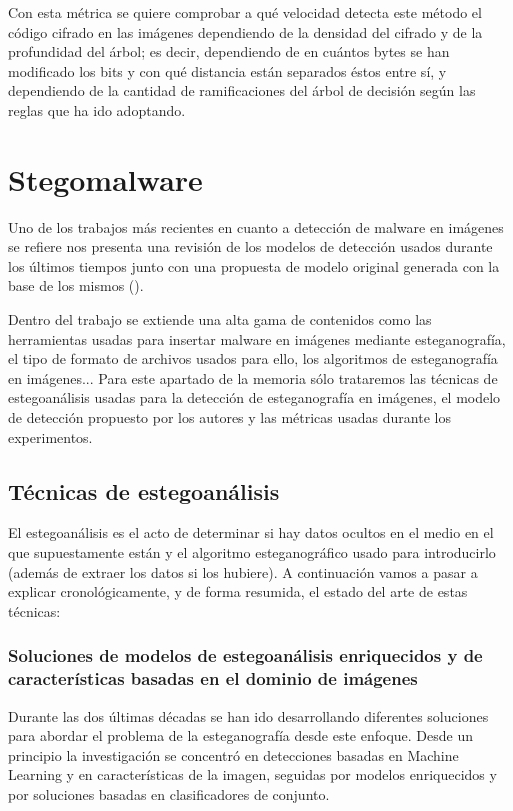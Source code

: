 Con esta métrica se quiere comprobar a qué velocidad detecta este método el código cifrado en las imágenes dependiendo de la densidad del cifrado y de la profundidad del árbol; es decir, dependiendo de en cuántos bytes se han modificado los bits y con qué distancia están separados éstos entre sí, y dependiendo de la cantidad de ramificaciones del árbol de decisión según las reglas que ha ido adoptando.

\section{Stegomalware}

Uno de los trabajos más recientes en cuanto a detección de malware en imágenes se refiere nos presenta una revisión de los modelos de detección usados durante los últimos tiempos junto con una propuesta de modelo original generada con la base de los mismos (\cite{stegomalware}). %

Dentro del trabajo se extiende una alta gama de contenidos como las herramientas usadas para insertar malware en imágenes mediante esteganografía, el tipo de formato de archivos usados para ello, los algoritmos de esteganografía en imágenes... Para este apartado de la memoria sólo trataremos las técnicas de estegoanálisis usadas para la detección de esteganografía en imágenes, el modelo de detección propuesto por los autores y las métricas usadas durante los experimentos.

\subsection{Técnicas de estegoanálisis}

El estegoanálisis es el acto de determinar si hay datos ocultos en el medio en el que supuestamente están y el algoritmo esteganográfico usado para introducirlo (además de extraer los datos si los hubiere). A continuación vamos a pasar a explicar cronológicamente, y de forma resumida, el estado del arte de estas técnicas:

\subsubsection{Soluciones de modelos de estegoanálisis enriquecidos y de características basadas en el dominio de imágenes}

Durante las dos últimas décadas se han ido desarrollando diferentes soluciones para abordar el problema de la esteganografía desde este enfoque. Desde un principio la investigación se concentró en detecciones basadas en Machine Learning y en características de la imagen, seguidas por modelos enriquecidos y por soluciones basadas en clasificadores de conjunto. 

